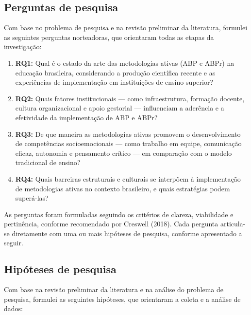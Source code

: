 \subsection{Perguntas de pesquisa}
\label{subsec:perguntas_pesquisa}

Com base no problema de pesquisa e na revisão preliminar da literatura, formulei as seguintes perguntas norteadoras, que orientaram todas as etapas da investigação:

\begin{enumerate}
    \item \textbf{RQ1:} Qual é o estado da arte das metodologias ativas (ABP e ABPr) na educação brasileira, considerando a produção científica recente e as experiências de implementação em instituições de ensino superior?
    \item \textbf{RQ2:} Quais fatores institucionais — como infraestrutura, formação docente, cultura organizacional e apoio gestorial — influenciam a aderência e a efetividade da implementação de ABP e ABPr?
    \item \textbf{RQ3:} De que maneira as metodologias ativas promovem o desenvolvimento de competências socioemocionais — como trabalho em equipe, comunicação eficaz, autonomia e pensamento crítico — em comparação com o modelo tradicional de ensino?
    \item \textbf{RQ4:} Quais barreiras estruturais e culturais se interpõem à implementação de metodologias ativas no contexto brasileiro, e quais estratégias podem superá-las?
\end{enumerate}

As perguntas foram formuladas seguindo os critérios de clareza, viabilidade e pertinência, conforme recomendado por Creswell (2018). Cada pergunta articula-se diretamente com uma ou mais hipóteses de pesquisa, conforme apresentado a seguir.

\subsection{Hipóteses de pesquisa}
\label{subsec:hipoteses_pesquisa}

Com base na revisão preliminar da literatura e na análise do problema de pesquisa, formulei as seguintes hipóteses, que orientaram a coleta e a análise de dados:

